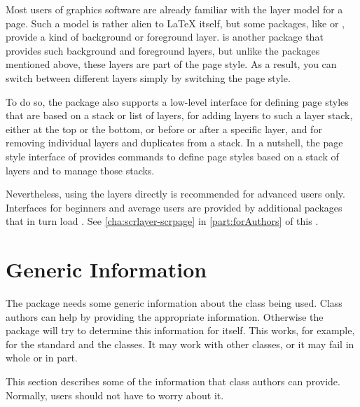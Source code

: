 \BeginIndexGroup
{}%
%
Most users of graphics software are already familiar with the layer model for
a page. Such a model is rather alien to \LaTeX{} itself, but some packages,
like  or , provide a kind of
background or foreground layer.  is another package that
provides such background and foreground layers, but unlike the packages
mentioned above, these layers are part of the page style. As a result, you can
switch between different layers simply by switching the page style.

To do so, the package also supports a low-level interface for defining page
styles that are based on a stack or list of layers, for adding layers to such
a layer stack, either at the top or the bottom, or before or after a specific
layer, and for removing individual layers and duplicates from a stack. In a
nutshell, the page style interface of  provides commands to
define page styles based on a stack of layers and to manage those stacks.

Nevertheless, using the layers directly is recommended for advanced users
only. Interfaces for beginners and average users are provided by additional
packages that in turn load . See
\autoref{cha:scrlayer-scrpage} in \autoref{part:forAuthors} of this
.



\section{Generic Information}

The package needs some generic information about the class being used. Class
authors can help  by providing the appropriate information.
Otherwise the package will try to determine this information for itself. This
works, for example, for the standard and the \KOMAScript{} classes. It may
work with other classes, or it may fail in whole or in part.

This section describes some of the information that class authors can provide.
Normally, users should not have to worry about it.

